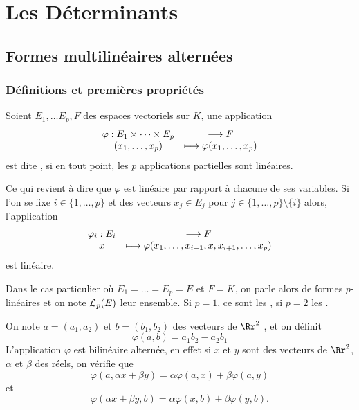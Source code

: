 \documentclass[class=report,crop=false]{standalone}
\begin{document}
\chapter{Les Déterminants}

\section{Formes multilinéaires alternées}

\subsection{Définitions et premières propriétés}

\begin{definition}
Soient $E_1,\dots E_p,F$ des espaces vectoriels sur $K$, une application
$$\begin{array}{cc}\varphi : E_1\times\dots\times E_p&\longrightarrow F\cr
(x_1,\dots,x_p)&\longmapsto \varphi(x_1,\dots,x_p)\cr\end{array} $$
est dite , si en tout point, 
les $p$ applications partielles sont linéaires.

Ce qui revient à dire que $\varphi$ est linéaire par rapport à chacune de ses variables.
Si l'on se fixe $i\in\{1,\dots,p\}$ et des vecteurs $x_j\in E_j$ pour $j\in\{1,\dots,p\}\setminus\{i\}$ alors, l'application 
$$\begin{array}{cc}\varphi_i: E_i&\longrightarrow F\cr
x&\longmapsto \varphi(x_1,\dots,x_{i-1},x,x_{i+1},\dots,x_p)\cr\end{array} $$
est linéaire.

Dans le cas particulier où $E_1=\dots=E_p=E$ et $F=K$, on parle 
alors de formes $p$-linéaires et on note 
${\cal{L}}_p(E)$ leur ensemble. Si $p=1$, ce sont les , 
si $p=2$ les .
\end{definition}


\begin{exemple}
On note $a=(a_1,a_2)$ et $b=(b_1,b_2)$ des vecteurs de $\Rr^2$ ,  et on définit
$$\varphi(a,b)=a_1b_2-a_2b_1 $$
L'application $\varphi$ est bilinéaire alternée, en effet si $x$ et $y$ sont des vecteurs de $\Rr^2$, $\alpha$ et $\beta$ des réels, on vérifie que
$$\varphi(a, \alpha x+\beta y)=\alpha\varphi(a,x)+\beta\varphi(a,y)$$ et
$$\varphi(\alpha x+\beta y,b)=\alpha\varphi(x,b)+\beta\varphi(y,b).$$  
\end{exemple}
\end{document}
